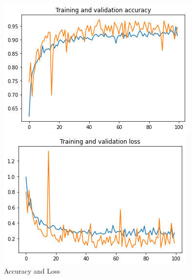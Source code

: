 \begin{figure}[ht]
  \centering
  \begin{minipage}[b]{0.4\linewidth}
    \centering
    \includegraphics[width=\linewidth]{Chapters/Chapter_5/figures/Training_and_validation_accuracy.png}
  \end{minipage}
  \hfill
  \begin{minipage}[b]{0.4\linewidth}
    \centering
    \includegraphics[width=\linewidth]{Chapters/Chapter_5/figures/Training_and_validation_loss.png}
  \end{minipage}
  \caption{Accuracy and Loss}
  \label{fig:figure5_3}
  \end{figure}
  
  
  
  
  
  
  
  
